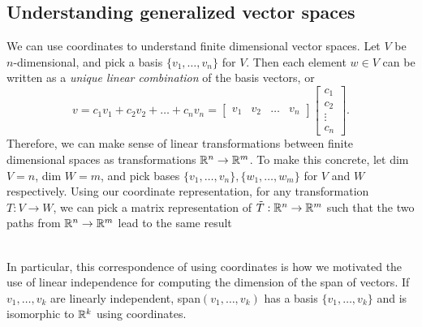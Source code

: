 \subsection*{Understanding generalized vector spaces}
We can use coordinates to understand finite dimensional vector spaces. Let $V$ be $n$-dimensional, and pick a basis $\{v_1,\ldots,v_n\}$ for $V$. Then each element $w\in V$ can be written as a \textit{unique linear combination} of the basis vectors, or \[
	v=c_1v_1+c_2v_2+\ldots+c_nv_n=\begin{bmatrix}
		v_1&v_2&\ldots&v_n
	\end{bmatrix}\begin{bmatrix}
		c_1\\c_2\\\vdots\\c_n
	\end{bmatrix}.
\]Therefore, we can make sense of linear transformations between finite dimensional spaces as transformations $\mathbb{R}^n\to\mathbb{R}^m$. To make this concrete, let dim$V=n$, dim $W=m$, and pick bases $\{v_1,\ldots,v_n\},\{w_1,\ldots,w_m\}$ for $V$ and $W$ respectively. Using our coordinate representation, for any transformation $T:V\to W$, we can pick a matrix representation of $\tilde{T}:\mathbb{R}^n\to\mathbb{R}^m$ such that the two paths from $\mathbb{R}^n\to\mathbb{R}^m$ lead to the same result

\\
In particular, this correspondence of using coordinates is how we motivated the use of linear independence for computing the dimension of the span of vectors. If $v_1,\ldots,v_k$ are linearly independent, span$(v_1,\ldots,v_k)$ has a basis $\{v_1,\ldots,v_k\}$ and is isomorphic to $\mathbb{R}^k$ using coordinates.
